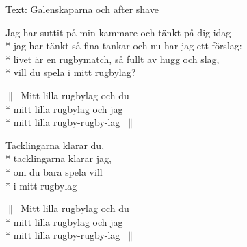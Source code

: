 \begin{SongText}
    \begin{SongInfo}
        Text: Galenskaparna och after shave
    \end{SongInfo}
    \begin{SongVerse}
        Jag har suttit på min kammare och tänkt på dig idag\\*%
        jag har tänkt så fina tankar och nu har jag ett förslag:\\*%
        livet är en rugbymatch, så fullt av hugg och slag,\\*%
        vill du spela i mitt rugbylag?
    \end{SongVerse}
    \begin{SongVerse}
        $\|\:$ Mitt lilla rugbylag och du\\*%
        mitt lilla rugbylag och jag\\*%
        mitt lilla rugby-rugby-lag $\:\|$
    \end{SongVerse}
    \begin{SongVerse}
        Tacklingarna klarar du,\\*%
        tacklingarna klarar jag,\\*%
        om du bara spela vill\\*%
        i mitt rugbylag
    \end{SongVerse}
    \begin{SongVerse}
        $\|\:$ Mitt lilla rugbylag och du\\*%
        mitt lilla rugbylag och jag\\*%
        mitt lilla rugby-rugby-lag $\:\|$
    \end{SongVerse}
\end{SongText}